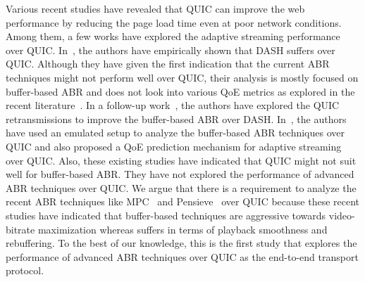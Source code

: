 Various recent studies \cite{Biswal2017,Megyesi2016} have revealed that QUIC can improve the web performance by reducing the page load time even at poor network conditions. Among them, a few works have explored the adaptive streaming performance over QUIC. In~\cite{bhat2017not}, the authors have empirically shown that DASH suffers over QUIC. Although they have given the first indication that the current ABR techniques might not perform well over QUIC, their analysis is mostly focused on buffer-based ABR and does not look into various QoE metrics as explored in the recent literature~\cite{yin2015control,mao2017neural}. In a follow-up work~\cite{bhat2018improving}, the authors have explored the QUIC retransmissions to improve the buffer-based ABR over DASH. In~\cite{van2018empirical}, the authors have used an emulated setup to analyze the buffer-based ABR techniques over QUIC and also proposed a QoE prediction mechanism for adaptive streaming over QUIC. Also, these existing studies have indicated that QUIC might not suit well for buffer-based ABR. They have not explored the performance of advanced ABR techniques over QUIC. We argue that there is a requirement to analyze the recent ABR techniques like MPC~\cite{yin2015control} and Pensieve~\cite{mao2017neural} over QUIC because these recent studies have indicated that buffer-based techniques are aggressive towards video-bitrate maximization whereas suffers in terms of playback smoothness and rebuffering. To the best of our knowledge, this is the first study that explores the performance of advanced ABR techniques over QUIC as the end-to-end transport protocol. 

